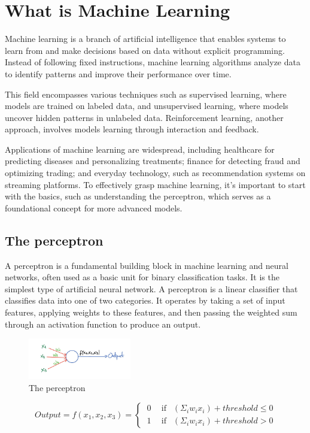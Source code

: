 \documentclass[../main]{subfiles}
\begin{document}
\chapter{What is Machine Learning}

{
\hypersetup{linkcolor=black}
\minitoc
}


Machine learning is a branch of artificial intelligence that enables systems to learn from and make decisions based on data without explicit programming. Instead of following fixed instructions, machine learning algorithms analyze data to identify patterns and improve their performance over time.

This field encompasses various techniques such as supervised learning, where models are trained on labeled data, and unsupervised learning, where models uncover hidden patterns in unlabeled data. Reinforcement learning, another approach, involves models learning through interaction and feedback.

Applications of machine learning are widespread, including healthcare for predicting diseases and personalizing treatments; finance for detecting fraud and optimizing trading; and everyday technology, such as recommendation systems on streaming platforms. To effectively grasp machine learning, it's important to start with the basics, such as understanding the perceptron, which serves as a foundational concept for more advanced models.

\section{The perceptron}

A perceptron is a fundamental building block in machine learning and neural networks, often used as a basic unit for binary classification tasks. It is the simplest type of artificial neural network. A perceptron is a linear classifier that classifies data into one of two categories. It operates by taking a set of input features, applying weights to these features, and then passing the weighted sum through an activation function to produce an output.
\begin{figure}[H]
  \centering
  \includegraphics[width=0.4\textwidth]{./figures/perceptron}
  \caption{The perceptron}
  \label{fig:red}
\end{figure}
\begin{equation*}
    Output = f(x_1, x_2, x_3) = \begin{cases}
  \ 0 \ \ & \text{if } \ \ (\Sigma_iw_ix_i) + threshold \leq 0 \\
  \ 1 \ & \text{if } \ \ (\Sigma_iw_ix_i) + threshold > 0
\end{cases}
\end{equation*}
\end{document}
